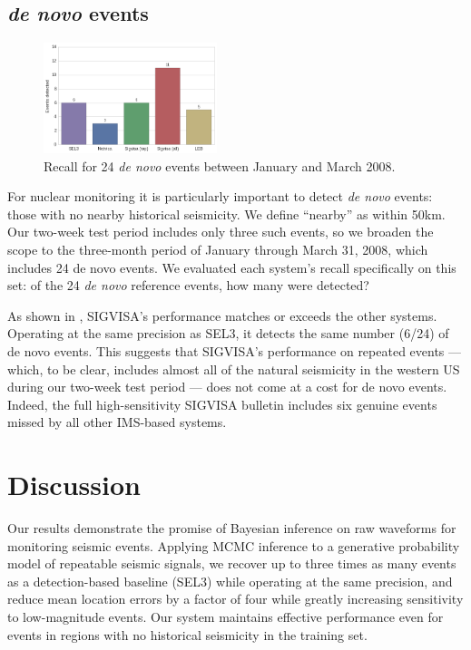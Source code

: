 \documentclass[twoside]{article} \usepackage{aistats2017}
\begin{document}
\subsection{{\em de novo} events}

\begin{figure}
\centering
\includegraphics[width=0.45\textwidth]{denovo_recall}
\caption{Recall for 24 {\em de novo} events between January and March
2008. }
\label{fig:denovo_results}
\end{figure}

For nuclear monitoring it is particularly important
to detect {\em de novo} events: those with no nearby historical
seismicity. We define ``nearby'' as within 50km. Our two-week test period includes only three
such events, so we broaden the scope to the
three-month period of January through March 31, 2008, which
includes 24 de novo events. We evaluated each system's recall
specifically on this set: of the 24 {\em de novo} reference events, how many were detected? 

As shown in , SIGVISA's
performance matches or exceeds the other systems. Operating at the
same precision as SEL3, it detects the same number (6/24) of de novo 
events. This suggests that SIGVISA's
performance on repeated events --- which, to be clear, includes almost
all of the natural seismicity in the western US during our two-week
test period --- does not come at a cost for de novo events. Indeed,
the full high-sensitivity SIGVISA bulletin includes six genuine events
missed by all other IMS-based systems.

\section{Discussion}

Our results demonstrate the promise of 
Bayesian inference on raw waveforms for monitoring seismic
events. Applying MCMC inference to a generative probability model of repeatable
seismic signals, we recover up to three times as many events as a
detection-based baseline (SEL3) while operating at the same precision,
and reduce mean location errors by a factor of four while greatly increasing
sensitivity to low-magnitude events. Our system maintains effective
performance even for events in regions with no historical seismicity
in the training set.
\end{document}
